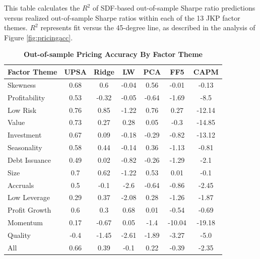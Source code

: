 \begin{table}[!t]\begin{center}
\caption{\textbf{Out-of-sample Pricing Accuracy By Factor Theme}}\label{tab:r_2_theme}
\setlength{\tabcolsep}{16pt}
\renewcommand{\arraystretch}{0.9}
\vspace{-.4in}
\noindent\begin{minipage}[c]{1\textwidth}%
\singlespacing
\footnotesize
This table calculates the $R^{2}$ of SDF-based out-of-sample Sharpe ratio predictions versus realized out-of-sample Sharpe ratios within each of the 13 JKP factor themes.  $R^{2}$ represents fit versus the 45-degree line, as described in the analysis of Figure \ref{fig:pricingacc}.
\medskip\end{minipage}
\small
\begin{tabular}{lcccccc}
\hline
Factor Theme & UPSA & Ridge & LW & PCA & FF5 & CAPM \\
\hline
Skewness & 0.68 & 0.6 & -0.04 & 0.56 & -0.01 & -0.13 \\
Profitability & 0.53 & -0.32 & -0.05 & -0.64 & -1.69 & -8.5 \\
Low Risk & 0.76 & 0.85 & -1.22 & 0.76 & 0.27 & -12.14 \\
Value & 0.73 & 0.27 & 0.28 & 0.05 & -0.3 & -14.85 \\
Investment & 0.67 & 0.09 & -0.18 & -0.29 & -0.82 & -13.12 \\
Seasonality & 0.58 & 0.44 & -0.14 & 0.36 & -1.13 & -0.81 \\
Debt Issuance & 0.49 & 0.02 & -0.82 & -0.26 & -1.29 & -2.1 \\
Size & 0.7 & 0.62 & -1.22 & 0.53 & 0.01 & -0.1 \\
Accruals & 0.5 & -0.1 & -2.6 & -0.64 & -0.86 & -2.45 \\
Low Leverage & 0.29 & 0.37 & -2.08 & 0.28 & -1.26 & -1.87 \\
Profit Growth & 0.6 & 0.3 & 0.68 & 0.01 & -0.54 & -0.69 \\
Momentum & 0.17 & -0.67 & 0.05 & -1.4 & -10.04 & -19.18 \\
Quality & -0.4 & -1.45 & -2.61 & -1.89 & -3.27 & -5.0 \\[1.5ex]
All & 0.66 & 0.39 & -0.1 & 0.22 & -0.39 & -2.35 \\
\hline
\end{tabular}
\end{center}
\end{table}